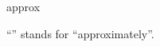 \documentclass{stex}
\begin{document}
\begin{smodule}{approx}
\begin{sparagraph}[style=symdoc]
``'' stands for ``approximately''.
\end{sparagraph}
\end{smodule}
\end{document}
